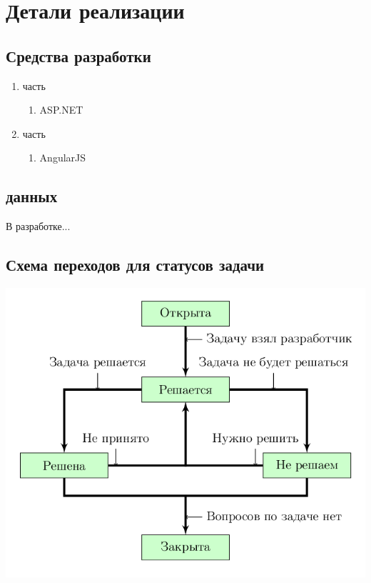 \documentclass[14pt,a4paper]{extarticle}
\begin{document}
	
	\section {Детали реализации}
	\subsection {Средства разработки}
	\begin{enumerate}
		\item { часть}
		\begin{enumerate}
			\item ASP.NET
		\end{enumerate}
		
		\item { часть}
		\begin{enumerate}
			\item AngularJS
		\end{enumerate}
	\end{enumerate}
		
	\subsection { данных}
	В разработке...
			
	\subsection {Схема переходов для статусов задачи}
	\begin{center}
		\includegraphics[scale=0.5]{res/TransitionScheme/TransitionScheme.png} 
	\end{center}
	
\end{document}
